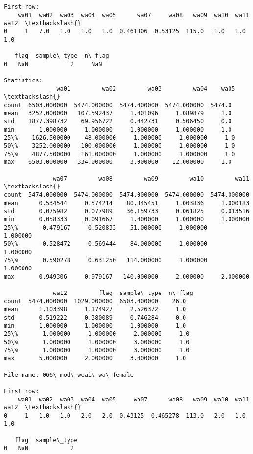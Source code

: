 \documentclass[11pt]{article}
\begin{document}
\begin{Verbatim}[commandchars=\\\{\}]
First row: 
    wa01  wa02  wa03  wa04  wa05      wa07     wa08   wa09  wa10  wa11  wa12  \textbackslash{}
0     1   7.0   1.0   1.0   1.0  0.461806  0.53125  115.0   1.0   1.0   1.0   

   flag  sample\_type  n\_flag  
0   NaN            2     NaN  

Statistics: 
               wa01         wa02         wa03         wa04    wa05  \textbackslash{}
count  6503.000000  5474.000000  5474.000000  5474.000000  5474.0   
mean   3252.000000   107.592437     1.001096     1.089879     1.0   
std    1877.398732    69.956722     0.042731     0.506450     0.0   
min       1.000000     1.000000     1.000000     1.000000     1.0   
25\%    1626.500000    48.000000     1.000000     1.000000     1.0   
50\%    3252.000000   100.000000     1.000000     1.000000     1.0   
75\%    4877.500000   161.000000     1.000000     1.000000     1.0   
max    6503.000000   334.000000     3.000000    12.000000     1.0   

              wa07         wa08         wa09         wa10         wa11  \textbackslash{}
count  5474.000000  5474.000000  5474.000000  5474.000000  5474.000000   
mean      0.534544     0.574214    80.845451     1.003836     1.000183   
std       0.075982     0.077989    36.159733     0.061825     0.013516   
min       0.058333     0.091667     1.000000     1.000000     1.000000   
25\%       0.479167     0.520833    51.000000     1.000000     1.000000   
50\%       0.528472     0.569444    84.000000     1.000000     1.000000   
75\%       0.590278     0.631250   114.000000     1.000000     1.000000   
max       0.949306     0.979167   140.000000     2.000000     2.000000   

              wa12         flag  sample\_type  n\_flag  
count  5474.000000  1029.000000  6503.000000    26.0  
mean      1.103398     1.174927     2.526372     1.0  
std       0.519222     0.380089     0.746284     0.0  
min       1.000000     1.000000     1.000000     1.0  
25\%       1.000000     1.000000     2.000000     1.0  
50\%       1.000000     1.000000     3.000000     1.0  
75\%       1.000000     1.000000     3.000000     1.0  
max       5.000000     2.000000     3.000000     1.0  

File name: 066\_mod\_weai\_wa\_female

First row: 
    wa01  wa02  wa03  wa04  wa05     wa07      wa08   wa09  wa10  wa11  wa12  \textbackslash{}
0     1   1.0   1.0   2.0   2.0  0.43125  0.465278  113.0   2.0   1.0   1.0   

   flag  sample\_type  
0   NaN            2  


\end{Verbatim}
\end{document}
